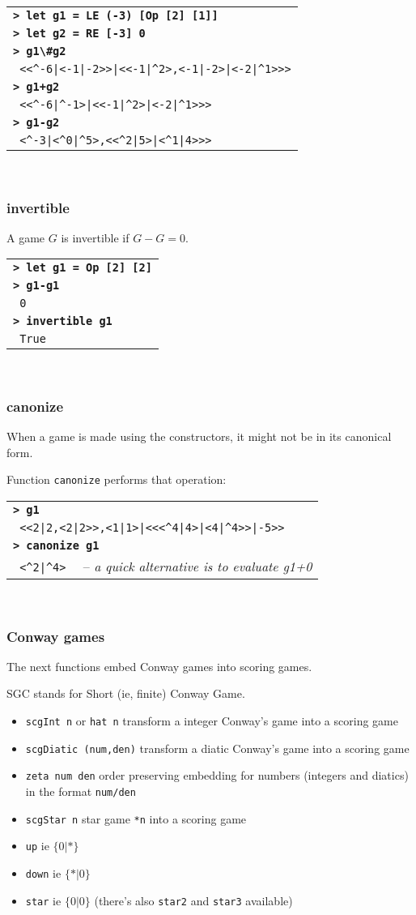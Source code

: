 \documentclass[a4paper,12pt]{article}
\newcommand{\bash}[1]{\small\textbf{\lstinline§> #1§}\\}
\newcommand{\out}[1]{\small\lstinline§ #1§}
\newcommand{\hsklcmt}[1]{~~-- \footnotesize\textit{#1}}
\newcommand{\haskellCode}{\fontfamily{pcr}\selectfont}
\newenvironment{sgcode}
	{ \haskellCode
	  \begin{tabular}{|p{0.9\textwidth}|}
      \hline	
	}
	{ \\\hline  
      \end{tabular} \\
	  \par 
	}
\begin{document}
\begin{sgcode}
\bash{let g1 = LE (-3) [Op [2] [1]]}
\bash{let g2 = RE [-3] 0}
\bash{g1\#g2}
\out{<<^-6|<-1|-2>>|<<-1|^2>,<-1|-2>|<-2|^1>>>} \\
\bash{g1+g2}
\out{<<^-6|^-1>|<<-1|^2>|<-2|^1>>>} \\
\bash{g1-g2}
\out{<^-3|<^0|^5>,<<^2|5>|<^1|4>>>}
\end{sgcode}

\subsubsection{invertible}

A game $G$ is invertible if $G-G=0$.

\begin{sgcode}
\bash{let g1 = Op [2] [2]}
\bash{g1-g1}
\out{0} \\
\bash{invertible g1}
\out{True}
\end{sgcode}

\subsubsection{canonize}

When a game is made using the constructors, it might not be in its canonical form. 

Function \verb!canonize! performs that operation:

\begin{sgcode}
\bash{g1}
\out{<<2|2,<2|2>>,<1|1>|<<<^4|4>|<4|^4>>|-5>>} \\
\bash{canonize g1}
\out{<^2|^4>} \hsklcmt{a quick alternative is to evaluate g1+0}
\end{sgcode}

\subsubsection{Conway games}

The next functions embed Conway games into scoring games.

SGC stands for Short (ie, finite) Conway Game.

\begin{itemize} \setlength\itemsep{0.1em}
  \item \verb|scgInt n| or \verb|hat n| transform a integer Conway's game into a scoring game
  \item \verb|scgDiatic (num,den)| transform a diatic Conway's game into a scoring game
  \item \verb|zeta num den| order preserving embedding for numbers (integers and diatics) in the format \verb|num/den|
  \item \verb|scgStar n| star game \verb|*n| into a scoring game
  \item \verb|up| ie $\{0|*\}$
  \item \verb|down| ie $\{*|0\}$
  \item \verb|star| ie $\{0|0\}$ (there's also \verb|star2| and \verb|star3| available)
\end{itemize}
\end{document}
